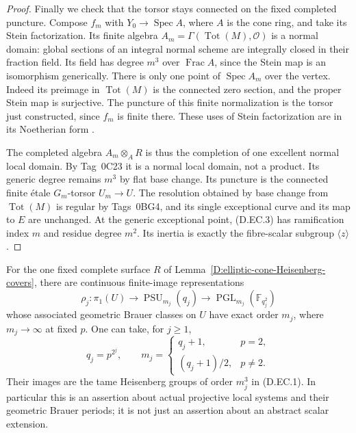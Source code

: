 \begin{proof}
Finally we check that the torsor stays connected on the
fixed completed puncture. Compose $f_m$ with
$Y_0\to\operatorname{Spec}A$, where $A$ is the cone ring,
and take its Stein factorization. Its finite algebra
$A_m=\Gamma(\operatorname{Tot}(M),\mathcal O)$ is a normal
domain: global sections of an integral normal scheme are
integrally closed in their fraction field. Its field has
degree $m^3$ over $\operatorname{Frac}A$, since the Stein map
is an isomorphism generically. There is only one point of
$\operatorname{Spec}A_m$ over the vertex. Indeed its preimage
in $\operatorname{Tot}(M)$ is the connected zero section,
and the proper Stein map is surjective.
The puncture of this finite normalization is the torsor just
constructed, since $f_m$ is finite there. These uses of Stein
factorization are in its Noetherian form
\citep[Theorem~37.53.4, Tag~03H0]{D_StacksEllipticThetaCone}.

The completed algebra $A_m\otimes_A R$ is thus the completion
of one excellent normal local domain. By Tag~0C23 it is a
normal local domain, not a product. Its generic degree remains
$m^3$ by flat base change. Its puncture is the connected finite
\'etale $G_m$-torsor $U_m\to U$.
The resolution obtained by base change from
$\operatorname{Tot}(M)$ is regular by Tags~0BG4, and its
single exceptional curve and its map to $E$ are unchanged.
At the generic exceptional point, (D.EC.3) has ramification
index $m$ and residue degree $m^2$. Its inertia is exactly
the fibre-scalar subgroup $\langle z\rangle$.
\end{proof}

\begin{proposition}
\label{D:fixed-elliptic-cone-unitary-geometric-periods}
For the one fixed complete surface $R$ of
Lemma~\ref{D:elliptic-cone-Heisenberg-covers}, there are
continuous finite-image representations
\[
 \rho_j:\pi_1(U)\longrightarrow\operatorname{PSU}_{m_j}(q_j)
             \longrightarrow\operatorname{PGL}_{m_j}(\mathbb F_{q_j^2})
                                                               \tag{D.EC.6}
\]
whose associated geometric Brauer classes on $U$ have
exact order $m_j$, where $m_j\to\infty$ at fixed $p$.
One can take, for $j\ge1$,
\[
 q_j=p^{2^j},\qquad
 m_j=\begin{cases}q_j+1,&p=2,\\ (q_j+1)/2,&p\ne2.\end{cases}
                                                               \tag{D.EC.7}
\]
Their images are the tame Heisenberg groups of order $m_j^3$
in (D.EC.1). In particular this is an assertion about actual
projective local systems and their geometric Brauer periods;
it is not just an assertion about an abstract scalar extension.
\end{proposition}


